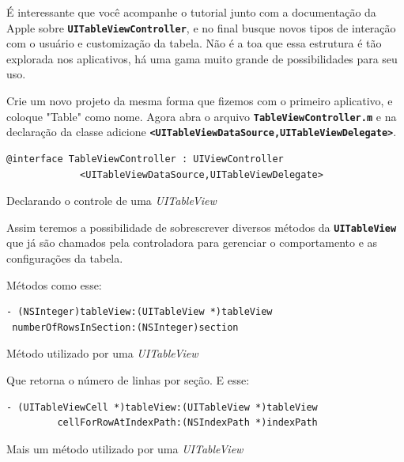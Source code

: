 \documentclass[a4paper,12pt,brazil,doubleside]{book}
\begin{document}
\begin{singlespace}
\bigskip


É interessante que você acompanhe o tutorial junto com a documentação da Apple sobre \texttt{\textbf{UITableViewController}}, e no final busque novos tipos de interação com o usuário e customização da tabela. Não é a toa que essa estrutura é tão explorada nos aplicativos, há uma gama muito grande de possibilidades para seu uso.

Crie um novo projeto da mesma forma que fizemos com o primeiro aplicativo, e coloque "Table" como nome. Agora abra o arquivo \texttt{\textbf{TableViewController.m}} e na declaração da classe adicione \texttt{\textbf{<UITableViewDataSource,UITableViewDelegate>}}.

\begin{listing}[H]
\begin{verbatim}
@interface TableViewController : UIViewController
             <UITableViewDataSource,UITableViewDelegate>
\end{verbatim}
\caption{Declarando o controle de uma \emph{UITableView}}
\end{listing}


Assim teremos a possibilidade de sobrescrever diversos métodos da \texttt{\textbf{UITableView}} que já são chamados pela controladora para gerenciar o comportamento e as configurações da tabela.

Métodos como esse:

\begin{listing}
\begin{verbatim}
- (NSInteger)tableView:(UITableView *)tableView
 numberOfRowsInSection:(NSInteger)section
\end{verbatim}
\caption{Método utilizado por uma \emph{UITableView}}
\end{listing}


Que retorna o número de linhas por seção. E esse:

\begin{listing}
\begin{verbatim}
- (UITableViewCell *)tableView:(UITableView *)tableView
         cellForRowAtIndexPath:(NSIndexPath *)indexPath
\end{verbatim}
\caption{Mais um método utilizado por uma \emph{UITableView}}
\end{listing}



\end{singlespace}
\end{document}

